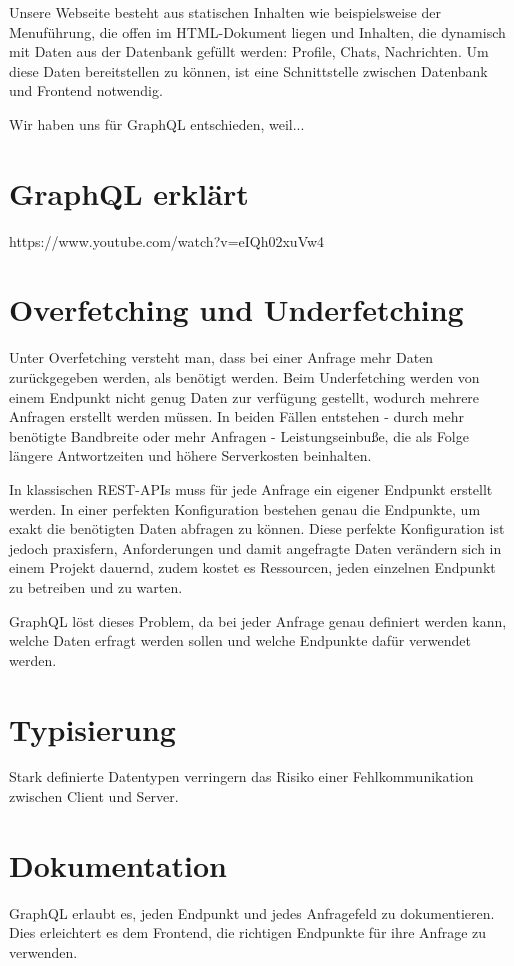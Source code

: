 Unsere Webseite besteht aus statischen Inhalten wie beispielsweise der Menuführung, die offen im HTML-Dokument liegen und Inhalten, die dynamisch mit Daten aus der Datenbank gefüllt werden: Profile, Chats, Nachrichten. Um diese Daten bereitstellen zu können, ist eine Schnittstelle zwischen Datenbank und Frontend notwendig. 

Wir haben uns für GraphQL entschieden, weil... %

\section{GraphQL erklärt}
https://www.youtube.com/watch?v=eIQh02xuVw4

\section{Overfetching und Underfetching}
Unter Overfetching versteht man, dass bei einer Anfrage mehr Daten zurückgegeben werden, als benötigt werden.
Beim Underfetching werden von einem Endpunkt nicht genug Daten zur verfügung gestellt, wodurch mehrere Anfragen erstellt werden müssen.
In beiden Fällen entstehen - durch mehr benötigte Bandbreite oder mehr Anfragen - Leistungseinbuße, die als Folge längere Antwortzeiten und höhere Serverkosten beinhalten.

In klassischen REST-APIs muss für jede Anfrage ein eigener Endpunkt erstellt werden. In einer perfekten Konfiguration bestehen genau die Endpunkte, um exakt die benötigten Daten abfragen zu können. Diese perfekte Konfiguration ist jedoch praxisfern, Anforderungen und damit angefragte Daten verändern sich in einem Projekt dauernd, zudem kostet es Ressourcen, jeden einzelnen Endpunkt zu betreiben und zu warten. 

GraphQL löst dieses Problem, da bei jeder Anfrage genau definiert werden kann, welche Daten erfragt werden sollen und welche Endpunkte dafür verwendet werden. 

\section{Typisierung}
Stark definierte Datentypen verringern das Risiko einer Fehlkommunikation zwischen Client und Server.

\section{Dokumentation}
GraphQL erlaubt es, jeden Endpunkt und jedes Anfragefeld zu dokumentieren. Dies erleichtert es dem Frontend, die richtigen Endpunkte für ihre Anfrage zu verwenden.

